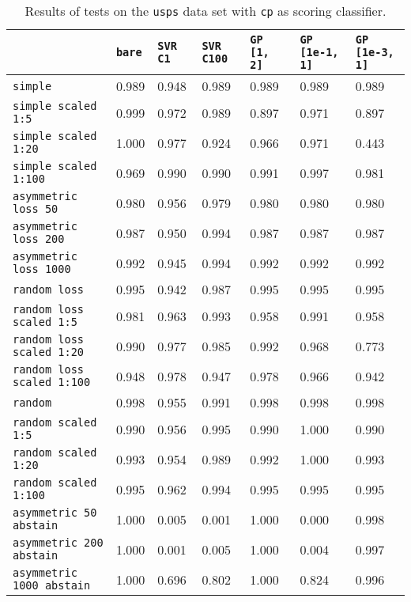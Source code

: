 \begin{table}[H]
{\scriptsize
\begin{tabu}{l|l|l|l|l|l|l}
&\texttt{bare} &\texttt{SVR C1} &\texttt{SVR C100} &\texttt{GP [1, 2]} &\texttt{GP [1e-1, 1]} &\texttt{GP [1e-3, 1]}  \\
\hline
\texttt{simple} &0.989 &0.948 &0.989 &0.989 &0.989 &0.989 \\
\texttt{simple scaled 1:5} &0.999 &0.972 &0.989 &0.897 &0.971 &0.897 \\
\texttt{simple scaled 1:20} &1.000 &0.977 &0.924 &0.966 &0.971 &0.443 \\
\texttt{simple scaled 1:100} &0.969 &0.990 &0.990 &0.991 &0.997 &0.981 \\
\texttt{asymmetric loss 50} &0.980 &0.956 &0.979 &0.980 &0.980 &0.980 \\
\texttt{asymmetric loss 200} &0.987 &0.950 &0.994 &0.987 &0.987 &0.987 \\
\texttt{asymmetric loss 1000} &0.992 &0.945 &0.994 &0.992 &0.992 &0.992 \\
\texttt{random loss} &0.995 &0.942 &0.987 &0.995 &0.995 &0.995 \\
\texttt{random loss scaled 1:5} &0.981 &0.963 &0.993 &0.958 &0.991 &0.958 \\
\texttt{random loss scaled 1:20} &0.990 &0.977 &0.985 &0.992 &0.968 &0.773 \\
\texttt{random loss scaled 1:100} &0.948 &0.978 &0.947 &0.978 &0.966 &0.942 \\
\texttt{random} &0.998 &0.955 &0.991 &0.998 &0.998 &0.998 \\
\texttt{random scaled 1:5} &0.990 &0.956 &0.995 &0.990 &1.000 &0.990 \\
\texttt{random scaled 1:20} &0.993 &0.954 &0.989 &0.992 &1.000 &0.993 \\
\texttt{random scaled 1:100} &0.995 &0.962 &0.994 &0.995 &0.995 &0.995 \\
\texttt{asymmetric 50 abstain} &1.000 &0.005 &0.001 &1.000 &0.000 &0.998 \\
\texttt{asymmetric 200 abstain} &1.000 &0.001 &0.005 &1.000 &0.004 &0.997 \\
\texttt{asymmetric 1000 abstain} &1.000 &0.696 &0.802 &1.000 &0.824 &0.996 \\
\end{tabu} }
\caption{Results of tests on the \texttt{usps} data set
         with \texttt{cp} as scoring classifier.}
\end{table}


